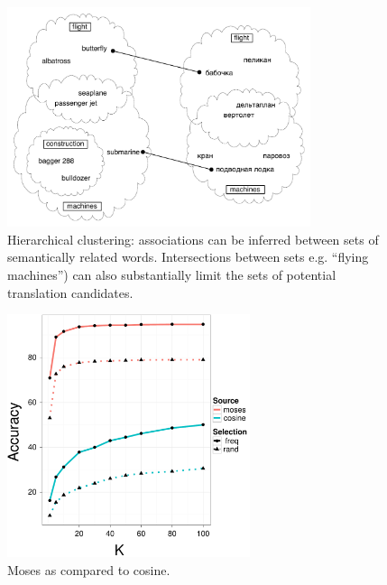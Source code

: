 \documentclass[11pt]{article}
\begin{document}

\begin{figure}
\centerline{\mbox{\includegraphics[width=3.5in]{figures/semclusters}}}
\caption{Hierarchical clustering:  associations can be inferred between sets of semantically related words.  Intersections between sets e.g. ``flying machines'') can also substantially limit the sets of potential translation candidates. }
\label{fig:cycle} \label{fig:semclusters}
\end{figure}


\begin{figure}
\centerline{\mbox{\includegraphics[width=2.8in]{figures/Moses-v-Cosine}}}
\caption{Moses as compared to cosine.}
\label{fig:moses-v-cosine}
\end{figure}
\end{document}
